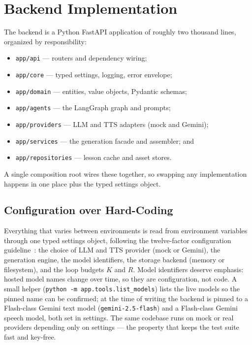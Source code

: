 \section{Backend Implementation}
\label{sec:backendimpl}

The backend is a Python FastAPI application of roughly two thousand lines,
organized by responsibility:

\begin{itemize}
  \item \texttt{app/api} --- routers and dependency wiring;
  \item \texttt{app/core} --- typed settings, logging, error envelope;
  \item \texttt{app/domain} --- entities, value objects, Pydantic schemas;
  \item \texttt{app/agents} --- the LangGraph graph and prompts;
  \item \texttt{app/providers} --- LLM and TTS adapters (mock and Gemini);
  \item \texttt{app/services} --- the generation facade and assembler; and
  \item \texttt{app/repositories} --- lesson cache and asset stores.
\end{itemize}

A single composition root wires these together, so swapping any
implementation happens in one place plus the typed settings object.

\subsection{Configuration over Hard-Coding}

Everything that varies between environments is read from environment
variables through one typed settings object, following the twelve-factor
configuration guideline~\cite{twelvefactor}: the choice of LLM and TTS
provider (mock or Gemini), the generation engine, the model identifiers, the
storage backend (memory or filesystem), and the loop budgets $K$ and $R$.
Model identifiers deserve emphasis: hosted model names change over time, so
they are configuration, not code. A small helper
(\texttt{python -m app.tools.list\_models}) lists the live models so the
pinned name can be confirmed; at the time of writing the backend is pinned to
a Flash-class Gemini text model (\texttt{gemini-2.5-flash}) and a Flash-class
Gemini speech model, both set in settings. The same codebase runs on mock or
real providers depending only on settings --- the property that keeps the
test suite fast and key-free.

